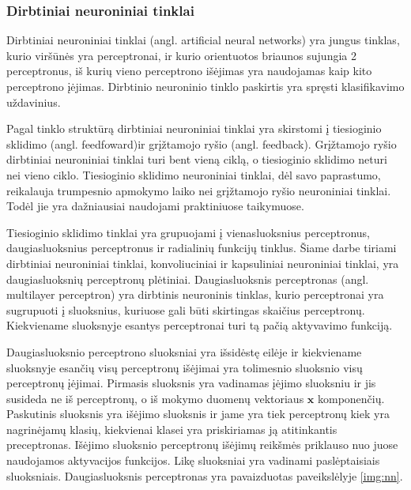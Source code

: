 \subsubsection{Dirbtiniai neuroniniai tinklai}

Dirbtiniai neuroniniai tinklai (angl. artificial neural networks) yra jungus tinklas, kurio viršūnės yra perceptronai, ir kurio orientuotos briaunos sujungia 2 perceptronus, iš kurių vieno perceptrono išėjimas yra naudojamas kaip kito perceptrono įėjimas. Dirbtinio neuroninio tinklo paskirtis yra spręsti klasifikavimo uždavinius.

Pagal tinklo struktūrą dirbtiniai neuroniniai tinklai yra skirstomi į tiesioginio sklidimo (angl. feedfoward)ir grįžtamojo ryšio (angl. feedback). Grįžtamojo ryšio dirbtiniai neuroniniai tinklai turi bent vieną ciklą, o tiesioginio sklidimo neturi nei vieno ciklo. Tiesioginio sklidimo neuroniniai tinklai, dėl savo paprastumo, reikalauja trumpesnio apmokymo laiko nei grįžtamojo ryšio neuroniniai tinklai. Todėl jie yra dažniausiai naudojami praktiniuose taikymuose.

Tiesioginio sklidimo tinklai yra grupuojami į vienasluoksnius perceptronus, daugiasluoksnius perceptronus ir radialinių funkcijų tinklus. Šiame darbe tiriami dirbtiniai neuroniniai tinklai, konvoliuciniai ir kapsuliniai neuroniniai tinklai, yra daugiasluoksnių perceptronų plėtiniai. Daugiasluoksnis perceptronas (angl. multilayer perceptron) yra dirbtinis neuroninis tinklas, kurio perceptronai yra sugrupuoti į sluoksnius, kuriuose gali būti skirtingas skaičius perceptronų. Kiekviename sluoksnyje esantys perceptronai turi tą pačią aktyvavimo funkciją.

Daugiasluoksnio perceptrono sluoksniai yra išsidėstę eilėje ir kiekviename sluoksnyje esančių visų perceptronų išėjimai yra tolimesnio sluoksnio visų perceptronų įėjimai. Pirmasis sluoksnis  yra vadinamas įėjimo sluoksniu ir jis susideda ne iš perceptronų, o iš mokymo duomenų vektoriaus $\boldsymbol{x}$ komponenčių. Paskutinis sluoksnis yra išėjimo sluoksnis ir jame yra tiek perceptronų kiek yra nagrinėjamų klasių, kiekvienai klasei yra priskiriamas ją atitinkantis preceptronas. Išėjimo sluoksnio perceptronų išėjimų reikšmės priklauso nuo juose naudojamos aktyvacijos funkcijos. Likę sluoksniai yra vadinami paslėptaisiais sluoksniais. Daugiasluoksnis perceptronas yra pavaizduotas paveikslėlyje \ref{img:nn}.

